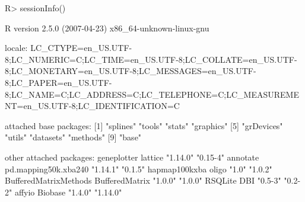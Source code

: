 \documentclass{article}
\begin{document}
\begin{Schunk}
\begin{Sinput}
R> sessionInfo()
\end{Sinput}
\begin{Soutput}
R version 2.5.0 (2007-04-23) 
x86_64-unknown-linux-gnu 

locale:
LC_CTYPE=en_US.UTF-8;LC_NUMERIC=C;LC_TIME=en_US.UTF-8;LC_COLLATE=en_US.UTF-8;LC_MONETARY=en_US.UTF-8;LC_MESSAGES=en_US.UTF-8;LC_PAPER=en_US.UTF-8;LC_NAME=C;LC_ADDRESS=C;LC_TELEPHONE=C;LC_MEASUREMENT=en_US.UTF-8;LC_IDENTIFICATION=C

attached base packages:
[1] "splines"   "tools"     "stats"     "graphics" 
[5] "grDevices" "utils"     "datasets"  "methods"  
[9] "base"     

other attached packages:
          geneplotter               lattice 
             "1.14.0"              "0.15-4" 
             annotate  pd.mapping50k.xba240 
             "1.14.1"               "0.1.5" 
        hapmap100kxba                 oligo 
                "1.0"               "1.0.2" 
BufferedMatrixMethods        BufferedMatrix 
              "1.0.0"               "1.0.0" 
              RSQLite                   DBI 
              "0.5-3"               "0.2-2" 
               affyio               Biobase 
              "1.4.0"              "1.14.0" 
\end{Soutput}
\end{Schunk}


\end{document}
